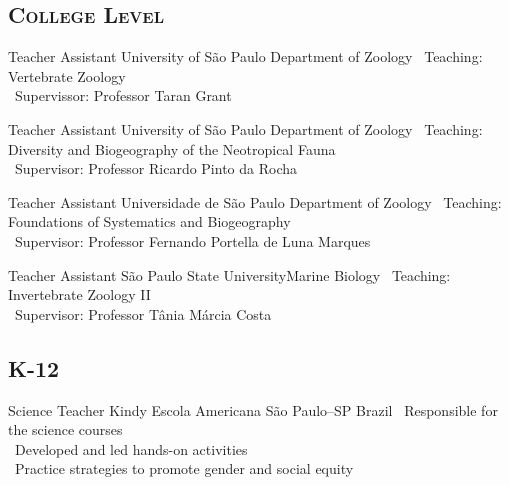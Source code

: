 \vspace{.5em}
	\subsection{\textsc{College Level}}
\vspace{.5em}

	{Teacher Assistant}
	{University of São Paulo}
	{Department of Zoology}
	{}
	{
		\textbullet~Teaching: Vertebrate Zoology\\
		\textbullet~Supervissor: Professor Taran Grant
	}

\vspace{.5em}

	{Teacher Assistant}
	{University of São Paulo}
	{Department of Zoology}
	{}
	{\textbullet~Teaching: Diversity and Biogeography of the Neotropical Fauna\\\textbullet~Supervisor: Professor Ricardo Pinto da Rocha
	}

\vspace{.5em}

	{Teacher Assistant}
	{Universidade de São Paulo}
	{Department of Zoology}
	{}
	{\textbullet~Teaching: Foundations of Systematics and Biogeography\\
		\textbullet~Supervisor: Professor Fernando Portella de Luna Marques
	}

\vspace{.5em}

	{Teacher Assistant}
	{São Paulo State University}{Marine Biology}
	{}
	{
		\textbullet~Teaching: Invertebrate Zoology II\\
		\textbullet~Supervisor: Professor Tânia Márcia Costa
	}

\vspace{.5em}
	\subsection{\textsc{K-12}}
\vspace{.5em}

	{Science Teacher}
	{Kindy Escola Americana}
	{São Paulo--SP}
	{Brazil}
	{
		\textbullet~Responsible for the science courses\\
		\textbullet~Developed and led hands-on activities\\
		\textbullet~Practice strategies to promote gender and social equity
	}

\vspace{.5em}


